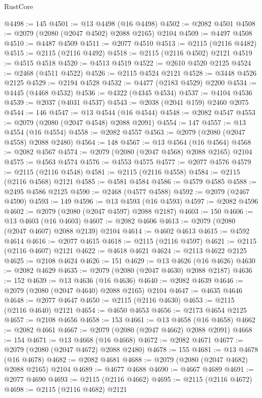 \begin{lexlean}{RustCore}
\begin{coremodule}
@4498 := 145
@4501 := @13 @4498 (@16 @4498)
@4502 := @2082 @4501
@4508 := @2079 (@2080 (@2047 @4502) @2088 @2165) @2104
@4509 := @4497 @4508
@4510 := @4487 @4509
@4511 := @2077 @4510
@4513 := @2115 (@2116 @4482)
@4515 := @2115 (@2116 @4492)
@4518 := @2115 (@2116 @4502) @2121
@4519 := @4515 @4518
@4520 := @4513 @4519
@4522 := @2610 @4520 @2125
@4524 := @2468 (@4511 @4522)
@4526 := @2115 @4524 @2121
@4528 := @3448 @4526 @2125
@4529 := @2194 @4528
@4532 := @4477 (@2183 @4529) @2200
@4534 := @4445 (@4468 @4532)
@4536 := @4322 (@4345 @4534)
@4537 := @4104 @4536
@4539 := @2037 (@4031 @4537)
@4543 := @2038 (@2041 @159) @2460 @2075
@4544 := 146
@4547 := @13 @4544 (@16 @4544)
@4548 := @2082 @4547
@4553 := @2079 (@2080 (@2047 @4548) @2088 @2091)
@4554 := 147
@4557 := @13 @4554 (@16 @4554)
@4558 := @2082 @4557
@4563 := @2079 (@2080 (@2047 @4558) @2088 @2480)
@4564 := 148
@4567 := @13 @4564 (@16 @4564)
@4568 := @2082 @4567
@4574 := @2079 (@2080 (@2047 @4568) @2088 @2165) @2104
@4575 := @4563 @4574
@4576 := @4553 @4575
@4577 := @2077 @4576
@4579 := @2115 (@2116 @4548)
@4581 := @2115 (@2116 @4558)
@4584 := @2115 (@2116 @4568) @2121
@4585 := @4581 @4584
@4586 := @4579 @4585
@4588 := @2495 @4586 @2125
@4590 := @2468 (@4577 @4588)
@4592 := @2079 (@2467 @4590)
@4593 := 149
@4596 := @13 @4593 (@16 @4593)
@4597 := @2082 @4596
@4602 := @2079 (@2080 (@2047 @4597) @2088 @2187)
@4603 := 150
@4606 := @13 @4603 (@16 @4603)
@4607 := @2082 @4606
@4613 := @2079 (@2080 (@2047 @4607) @2088 @2139) @2104
@4614 := @4602 @4613
@4615 := @4592 @4614
@4616 := @2077 @4615
@4618 := @2115 (@2116 @4597)
@4621 := @2115 (@2116 @4607) @2121
@4622 := @4618 @4621
@4624 := @2113 @4622 @2125
@4625 := @2108 @4624
@4626 := 151
@4629 := @13 @4626 (@16 @4626)
@4630 := @2082 @4629
@4635 := @2079 (@2080 (@2047 @4630) @2088 @2187)
@4636 := 152
@4639 := @13 @4636 (@16 @4636)
@4640 := @2082 @4639
@4646 := @2079 (@2080 (@2047 @4640) @2088 @2165) @2104
@4647 := @4635 @4646
@4648 := @2077 @4647
@4650 := @2115 (@2116 @4630)
@4653 := @2115 (@2116 @4640) @2121
@4654 := @4650 @4653
@4656 := @2173 @4654 @2125
@4657 := @2108 @4656
@4658 := 153
@4661 := @13 @4658 (@16 @4658)
@4662 := @2082 @4661
@4667 := @2079 (@2080 (@2047 @4662) @2088 @2091)
@4668 := 154
@4671 := @13 @4668 (@16 @4668)
@4672 := @2082 @4671
@4677 := @2079 (@2080 (@2047 @4672) @2088 @2480)
@4678 := 155
@4681 := @13 @4678 (@16 @4678)
@4682 := @2082 @4681
@4688 := @2079 (@2080 (@2047 @4682) @2088 @2165) @2104
@4689 := @4677 @4688
@4690 := @4667 @4689
@4691 := @2077 @4690
@4693 := @2115 (@2116 @4662)
@4695 := @2115 (@2116 @4672)
@4698 := @2115 (@2116 @4682) @2121

\end{coremodule}
\end{lexlean}
